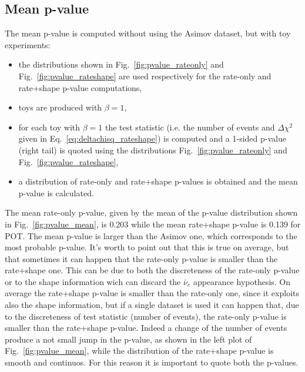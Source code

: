 
\subsection {Mean p-value}
\label{subsec:pvalue_mean}

The mean p-value is computed without using the Asimov dataset, but with toy experiments:
\begin{itemize}
\item the distributions shown in Fig.~\ref{fig:pvalue_rateonly} and Fig.~\ref{fig:pvalue_rateshape} 
	are used respectively for the rate-only and rate+shape p-value computations,
\item \NumToysLarge toys are produced with $\beta = 1$, 
\item for each toy with $\beta=1$ the test statistic (i.e. the number of events and 
	$\Delta \chi^2$ given in Eq.~\ref{eq:deltachisq_rateshape})
	is computed and a 1-sided p-value (right tail) is quoted using the distributions 
	Fig.~\ref{fig:pvalue_rateonly} and Fig.~\ref{fig:pvalue_rateshape}, 
\item a distribution of rate-only and rate+shape p-values is obtained and the mean p-value is calculated.
\end{itemize}

The mean rate-only p-value, given by the mean of the p-value distribution shown in Fig.~\ref{fig:pvalue_mean}, is 0.203
while the mean rate+shape p-value is 0.139  for 
\TotalPot POT.
The mean p-value is larger than the Asimov one, which corresponds to the most probable p-value. 
It's worth to point out that this is true on average, but that sometimes it can happen that the rate-only
p-value is smaller than the rate+shape one. This can be due to both the discreteness of the rate-only
p-value or to the shape information wich can discard the $\bar{\nu}_e$ appearance hypothesis.
On average the rate+shape p-value is smaller than the rate-only one,
since it exploits also the shape information, but if a single dataset is used
it can happen that, due to the discreteness of test statistic (number of events), the rate-only p-value
is smaller than the rate+shape p-value.
Indeed a change of the number of events produce a not small jump in the p-value, 
as shown in the left plot of Fig.~\ref{fig:pvalue_mean}, while the distribution of the 
rate+shape p-value is smooth and continuos.
For this reason it is important to quote both the p-values.
 
